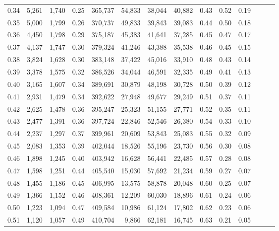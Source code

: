 \begin{tabular}{rrrrrrrrrrrrrr}
0.34 &   5,261 &  1,740 &  0.25 &  365,737 &   54,833 &  38,044 &  40,882 &  0.43 &  0.52 &      0.19 \\
0.35 &   5,000 &  1,799 &  0.26 &  370,737 &   49,833 &  39,843 &  39,083 &  0.44 &  0.50 &      0.18 \\
0.36 &   4,450 &  1,798 &  0.29 &  375,187 &   45,383 &  41,641 &  37,285 &  0.45 &  0.47 &      0.17 \\
0.37 &   4,137 &  1,747 &  0.30 &  379,324 &   41,246 &  43,388 &  35,538 &  0.46 &  0.45 &      0.15 \\
0.38 &   3,824 &  1,628 &  0.30 &  383,148 &   37,422 &  45,016 &  33,910 &  0.48 &  0.43 &      0.14 \\
0.39 &   3,378 &  1,575 &  0.32 &  386,526 &   34,044 &  46,591 &  32,335 &  0.49 &  0.41 &      0.13 \\
0.40 &   3,165 &  1,607 &  0.34 &  389,691 &   30,879 &  48,198 &  30,728 &  0.50 &  0.39 &      0.12 \\
0.41 &   2,931 &  1,479 &  0.34 &  392,622 &   27,948 &  49,677 &  29,249 &  0.51 &  0.37 &      0.11 \\
0.42 &   2,625 &  1,478 &  0.36 &  395,247 &   25,323 &  51,155 &  27,771 &  0.52 &  0.35 &      0.11 \\
0.43 &   2,477 &  1,391 &  0.36 &  397,724 &   22,846 &  52,546 &  26,380 &  0.54 &  0.33 &      0.10 \\
0.44 &   2,237 &  1,297 &  0.37 &  399,961 &   20,609 &  53,843 &  25,083 &  0.55 &  0.32 &      0.09 \\
0.45 &   2,083 &  1,353 &  0.39 &  402,044 &   18,526 &  55,196 &  23,730 &  0.56 &  0.30 &      0.08 \\
0.46 &   1,898 &  1,245 &  0.40 &  403,942 &   16,628 &  56,441 &  22,485 &  0.57 &  0.28 &      0.08 \\
0.47 &   1,598 &  1,251 &  0.44 &  405,540 &   15,030 &  57,692 &  21,234 &  0.59 &  0.27 &      0.07 \\
0.48 &   1,455 &  1,186 &  0.45 &  406,995 &   13,575 &  58,878 &  20,048 &  0.60 &  0.25 &      0.07 \\
0.49 &   1,366 &  1,152 &  0.46 &  408,361 &   12,209 &  60,030 &  18,896 &  0.61 &  0.24 &      0.06 \\
0.50 &   1,223 &  1,094 &  0.47 &  409,584 &   10,986 &  61,124 &  17,802 &  0.62 &  0.23 &      0.06 \\
0.51 &   1,120 &  1,057 &  0.49 &  410,704 &    9,866 &  62,181 &  16,745 &  0.63 &  0.21 &      0.05 \\

\end{tabular}
